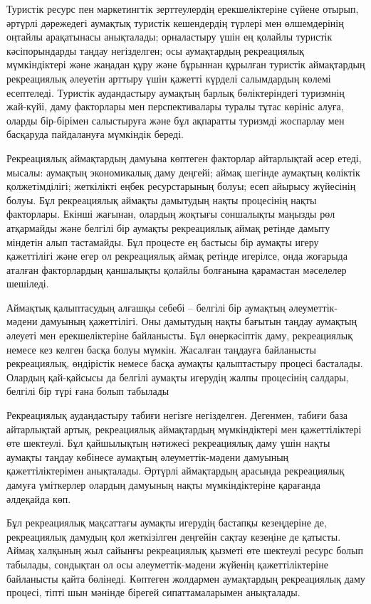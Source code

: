 \begin{multicols}{2}
Туристік ресурс пен маркетингтік зерттеулердің ерекшеліктеріне сүйене
отырып, әртүрлі дәрежедегі аумақтық туристік кешендердің түрлері мен
өлшемдерінің оңтайлы арақатынасы анықталады; орналастыру үшін ең қолайлы
туристік кәсіпорындарды таңдау негізделген; осы аумақтардың рекреациялық
мүмкіндіктері және жаңадан құру және бұрыннан құрылған туристік
аймақтардың рекреациялық әлеуетін арттыру үшін қажетті күрделі
салымдардың көлемі есептеледі. Туристік аудандастыру аумақтың барлық
бөліктеріндегі туризмнің жай-күйі, даму факторлары мен перспективалары
туралы тұтас көрініс алуға, оларды бір-бірімен салыстыруға және бұл
ақпаратты туризмді жоспарлау мен басқаруда пайдалануға мүмкіндік береді.

Рекреациялық аймақтардың дамуына көптеген факторлар айтарлықтай әсер
етеді, мысалы: аумақтың экономикалық даму деңгейі; аймақ шегінде
аумақтың көліктік қолжетімділігі; жеткілікті еңбек ресурстарының болуы;
есеп айырысу жүйесінің болуы. Бұл рекреациялық аймақты дамытудың нақты
процесінің нақты факторлары. Екінші жағынан, олардың жоқтығы соншалықты
маңызды рөл атқармайды және белгілі бір аумақты рекреациялық аймақ
ретінде дамыту міндетін алып тастамайды. Бұл процесте ең бастысы бір
аумақты игеру қажеттілігі және егер ол рекреациялық аймақ ретінде
игерілсе, онда жоғарыда аталған факторлардың қаншалықты қолайлы
болғанына қарамастан мәселелер шешіледі.

Аймақтық қалыптасудың алғашқы себебі -- белгілі бір аумақтың
әлеуметтік-мәдени дамуының қажеттілігі. Оны дамытудың нақты бағытын
таңдау аумақтың әлеуеті мен ерекшеліктеріне байланысты. Бұл өнеркәсіптік
даму, рекреациялық немесе кез келген басқа болуы мүмкін. Жасалған
таңдауға байланысты рекреациялық, өндірістік немесе басқа аумақты
қалыптастыру процесі басталады. Олардың қай-қайсысы да белгілі аумақты
игерудің жалпы процесінің салдары, белгілі бір түрі ғана болып табылады

Рекреациялық аудандастыру табиғи негізге негізделген. Дегенмен, табиғи
база айтарлықтай артық, рекреациялық аймақтардың мүмкіндіктері мен
қажеттіліктері өте шектеулі. Бұл қайшылықтың нәтижесі рекреациялық даму
үшін нақты аумақты таңдау көбінесе аумақтың әлеуметтік-мәдени дамуының
қажеттіліктерімен анықталады. Әртүрлі аймақтардың арасында рекреациялық
дамуға үміткерлер олардың дамуының нақты мүмкіндіктеріне қарағанда
әлдеқайда көп.

Бұл рекреациялық мақсаттағы аумақты игерудің бастапқы кезеңдеріне де,
рекреациялық дамудың қол жеткізілген деңгейін сақтау кезеңіне де
қатысты. Аймақ халқының жыл сайынғы рекреациялық қызметі өте шектеулі
ресурс болып табылады, сондықтан ол осы әлеуметтік-мәдени жүйенің
қажеттіліктеріне байланысты қайта бөлінеді. Көптеген жолдармен
аумақтардың рекреациялық даму процесі, тіпті шын мәнінде бірегей
сипаттамаларымен анықталады.


\end{multicols}
